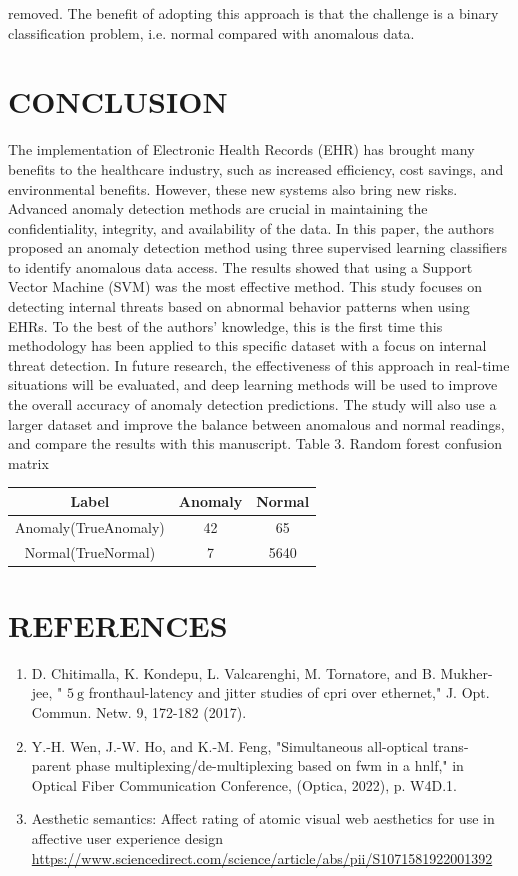 \documentclass[10pt]{article}
\begin{document}
removed. The benefit of adopting this approach is that the challenge is a binary classification problem, i.e. normal compared with anomalous data.

\section{CONCLUSION}
The implementation of Electronic Health Records (EHR) has brought many benefits to the healthcare industry, such as increased efficiency, cost savings, and environmental benefits. However, these new systems also bring new risks. Advanced anomaly detection methods are crucial in maintaining the confidentiality, integrity, and availability of the data. In this paper, the authors proposed an anomaly detection method using three supervised learning classifiers to identify anomalous data access. The results showed that using a Support Vector Machine (SVM) was the most effective method. This study focuses on detecting internal threats based on abnormal behavior patterns when using EHRs. To the best of the authors' knowledge, this is the first time this methodology has been applied to this specific dataset with a focus on internal threat detection. In future research, the effectiveness of this approach in real-time situations will be evaluated, and deep learning methods will be used to improve the overall accuracy of anomaly detection predictions. The study will also use a larger dataset and improve the balance between anomalous and normal readings, and compare the results with this manuscript. Table 3. Random forest confusion matrix

\begin{center}
\begin{tabular}{ccc}
Label & Anomaly & Normal \\
\hline
Anomaly(TrueAnomaly) & 42 & 65 \\
Normal(TrueNormal) & 7 & 5640 \\
\hline
\end{tabular}
\end{center}

\section{REFERENCES}
\begin{enumerate}
  \item D. Chitimalla, K. Kondepu, L. Valcarenghi, M. Tornatore, and B. Mukher- jee, " $5 \mathrm{~g}$ fronthaul-latency and jitter studies of cpri over ethernet," J. Opt. Commun. Netw. 9, 172-182 (2017).

  \item Y.-H. Wen, J.-W. Ho, and K.-M. Feng, "Simultaneous all-optical trans- parent phase multiplexing/de-multiplexing based on fwm in a hnlf," in Optical Fiber Communication Conference, (Optica, 2022), p. W4D.1.

  \item Aesthetic semantics: Affect rating of atomic visual web aesthetics for use in affective user experience design \href{https://www.sciencedirect.com/science/article/abs/pii/S1071581922001392}{https://www.sciencedirect.com/science/article/abs/pii/S1071581922001392}

\end{enumerate}
\end{document}
